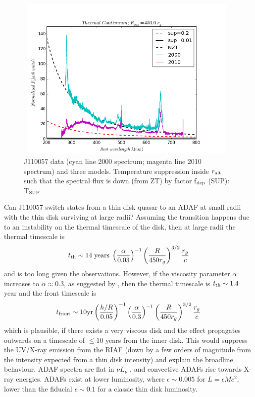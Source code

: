 \documentclass[11pt,a4paper]{article}
\begin{document}
\begin{figure}
  \centering
  \includegraphics[width=11.00cm, height=8.0cm, trim=0.3cm 0.0cm 2.0cm 0.0cm, clip]
  {../plots/models/mcd_gap_v3_1_b1.png}
  \caption[]{
    J110057 data (cyan line 2000 spectrum; magenta line 2010 spectrum) and
    three models.  Temperature suppression inside $r_{\rm alt}$ such that
    the spectral flux is down (from ZT) by factor f$_{\rm dep}$ (SUP): T$_{\rm SUP}$
  }
  \label{fig:disk_suppression}
\end{figure}
Can J110057 switch states from a thin disk quasar to an ADAF at small
radii with the thin disk surviving at large radii?  Assuming the
transition happens due to an instability on the thermal timescale of
the disk, then at large radii the thermal timescale is
\begin{equation}
    t_{\rm th} \sim 14 \; {\rm years} \; \left(\frac{\alpha}{0.03}\right)^{-1}
                                                \left(\frac{R}{450r_{g}}\right)^{3/2} 
                                                        \frac{r_{g}}{c}
\end{equation} 
and is too long given the observations. However, if the viscosity
parameter $\alpha$ increases to $\alpha \approx 0.3$, as suggested by
\citet{King2007}, then the thermal timescale is $t_{\rm th} \sim 1.4$
year and the front timescale is
\begin{equation}
    t_{\rm front}  \sim  10{\rm yr}  \left(\frac{h/R}{0.05}\right)^{-1}
                                                 \left(\frac{\alpha}{0.3}\right)^{-1}  
                                                 \left(\frac{R}{450r_{g}}\right)^{3/2}  
                                                         \frac{r_{g}}{c}
\label{eqn:t_front}
\end{equation}
which is plausible, if there exists a very viscous disk and the effect
propagates outwards on a timescale of $\leq 10$ years from the inner
disk. This would suppress the UV/X-ray emission from the RIAF (down by
a few orders of magnitude from the intensity expected from a thin disk
intensity) and explain the broadline behaviour.  ADAF spectra are flat
in $\nu L_{\nu}$ \citet{Narayan1998, Abramowicz2002, Abramowicz2013},
and convective ADAFs rise towards X-ray energies. ADAFs exist at lower
luminosity, where $\epsilon \sim 0.005$ for $L=\epsilon \dot{M}
c^{2}$, lower than the fiducial $\epsilon \sim 0.1$ for a classic thin
disk luminosity.
\end{document}
